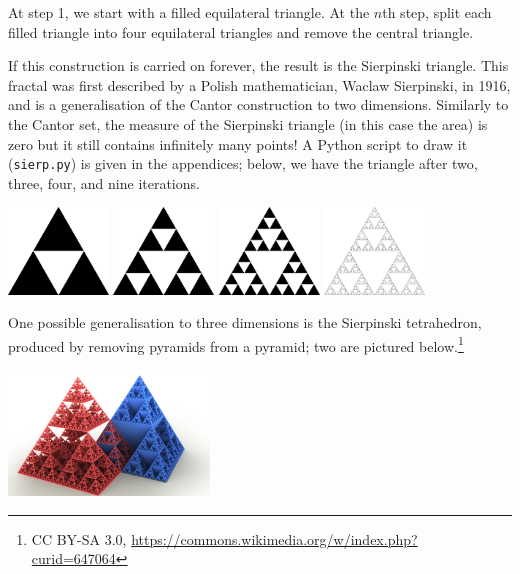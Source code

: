 \begin{con}
  At step 1, we start with a filled equilateral triangle. At the $ n$th step, split each filled triangle into four equilateral triangles
  and remove the central triangle.
\end{con}
If this construction is carried on forever, the result is the Sierpinski triangle. This fractal was first described by a Polish mathematician,
Waclaw Sierpinski, in 1916, and is a generalisation of the Cantor construction to two dimensions. Similarly to the Cantor set, the measure of
the Sierpinski triangle (in this case the area) is zero but it still contains infinitely many points! A Python script to draw it (\texttt{sierp.py})
is given in the appendices; below, we have the triangle after two, three, four, and nine iterations.
\begin{center}
  \includegraphics[width=0.2\textwidth]{sierp2}
  \includegraphics[width=0.2\textwidth]{sierp3}
  \includegraphics[width=0.2\textwidth]{sierp4}
  \includegraphics[width=0.2\textwidth]{sierp9}
\end{center}

One possible generalisation to three dimensions is the Sierpinski tetrahedron, produced by removing pyramids from a pyramid; two are pictured
below.\footnote{CC BY-SA 3.0, \url{https://commons.wikimedia.org/w/index.php?curid=647064}}
\begin{center}
  \includegraphics[width=0.4\textwidth]{sierpyramid}
\end{center}

